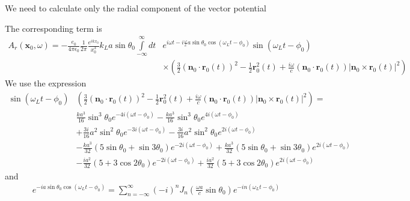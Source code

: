We need to calculate only the radial component of the vector potential

The corresponding term is
\begin{align}
    A_r({\bm x}_0,\omega)  =-\frac{e_0}{4\pi\epsilon_0}\frac1{2\pi}\frac{e^{ikx_0}}{x_0^3}k_La\sin\theta_0\int\limits_{-\infty}^{\infty}dt & e^{i\omega t-i\frac{\omega}ca\sin\theta_0\cos(\omega_Lt-\phi_0)}\sin(\omega_Lt-\phi_0)\nonumber                                                                          \\
                                                                                                                                           & \times\left(\frac32{({\bm n}_0\cdot{\bm r}_0(t))^2}-\frac12{{\bm r}^2_0(t)}+\frac{i\omega}{c}{({\bm n}_0\cdot{\bm r}_0(t))|{\bm n}_0\times{\bm r}_0(t)|^2}       \right)
\end{align}
We use the expression
\begin{align}
    \sin(\omega_Lt-\phi_0) & \left(\frac32{({\bm n}_0\cdot{\bm r}_0(t))^2}  -\frac12{{\bm r}^2_0(t)}+\frac{i\omega}{c}({\bm n}_0\cdot{\bm r}_0(t))|{\bm n}_0\times{\bm r}_0(t)|^2 \right)=\nonumber \\
                           & \frac{ka^3}{16}\sin^3\theta_0e^{-4i(\omega t-\phi_0)}-\frac{ka^3}{16}\sin^3\theta_0e^{4i(\omega t-\phi_0)}\nonumber                                                    \\
                           & +\frac{3i}{16}a^2\sin^2\theta_0e^{-3i(\omega t-\phi_0)}-\frac{3i}{16}a^2\sin^2\theta_0e^{2i(\omega t-\phi_0)}\nonumber                                                 \\
                           & -\frac{ka^3}{32}(5\sin\theta_0+\sin3\theta_0)e^{-2i(\omega t-\phi_0)}+\frac{ka^3}{32}(5\sin\theta_0+\sin3\theta_0)e^{2i(\omega t-\phi_0)}\nonumber                     \\
                           & -\frac{ia^2}{32}(5+3\cos 2\theta_0)e^{-2i(\omega t-\phi_0)}+\frac{ia^2}{32}(5+3\cos 2\theta_0)e^{2i(\omega t-\phi_0)}
\end{align}
and
\begin{align}
    e^{-ia\sin\theta_0\cos(\omega_Lt-\phi_0)}=\sum_{n=-\infty}^{\infty} (-i)^n J_n(\frac{\omega a}c\sin\theta_0) e^{-i n (\omega_Lt-\phi_0)}
\end{align}
